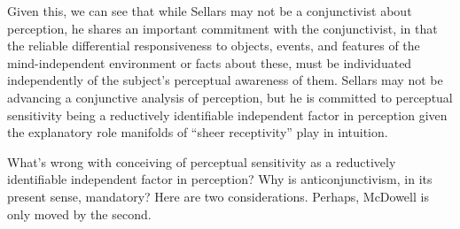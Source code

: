 \documentclass[12pt]{article}
\begin{document}
Given this, we can see that while Sellars may not be a conjunctivist about perception, he shares an important commitment with the conjunctivist, in that the reliable differential responsiveness to objects, events, and features of the mind-independent environment or facts about these, must be individuated independently of the subject's perceptual awareness of them. Sellars may not be advancing a conjunctive analysis of perception, but he is committed to perceptual sensitivity being a reductively identifiable independent factor in perception given the explanatory role manifolds of ``sheer receptivity'' play in intuition. 

What's wrong with conceiving of perceptual sensitivity as a reductively identifiable independent factor in perception? Why is anticonjunctivism, in its present sense, mandatory? Here are two considerations. Perhaps, McDowell is only moved by the second. 
\end{document}
